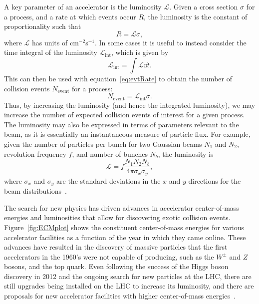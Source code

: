 A key parameter of an accelerator is the luminosity $\mathcal{L}$.
Given a cross section $\sigma$ for a process, and a rate at which events occur $R$, the luminosity is the constant of proportionality such that
\begin{equation}\label{eq:evtRate}
  R=\mathcal{L}\sigma,
\end{equation}
where $\mathcal{L}$ has units of cm$^{-2}$s$^{-1}$.
In some cases it is useful to instead consider the time integral of the luminosity $\mathcal{L}_\mathrm{int}$, which is given by
\begin{equation}
  \mathcal{L}_\mathrm{int}=\int\mathcal{L}\dd{t}.
\end{equation}
This can then be used with equation~\ref{eq:evtRate} to obtain the number of collision events $N_\mathrm{event}$ for a process:
\begin{equation}
  N_\mathrm{event}=\mathcal{L}_\mathrm{int}\sigma.
\end{equation}
Thus, by increasing the luminosity (and hence the integrated luminosity), we may increase the number of expected collision events of interest for a given process.
The luminosity may also be expressed in terms of parameters relevant to the beam, as it is essentially an instantaneous measure of particle flux.
For example, given the number of particles per bunch for two Gaussian beams $N_1$ and $N_2$, revolution frequency $f$, and number of bunches $N_b$, the luminosity is
\begin{equation}
  \mathcal{L}=f\frac{N_1N_2N_b}{4\pi\sigma_x\sigma_y},
\end{equation}
where $\sigma_x$ and $\sigma_y$ are the standard deviations in the $x$ and $y$ directions for the beam distributions~\cite{Herr:941318}.

The search for new physics has driven advances in accelerator center-of-mass energies and luminosities that allow for discovering exotic collision events.
Figure~\ref{fig:ECMplot} shows the constituent center-of-mass energies for various accelerator facilities as a function of the year in which they came online.
These advances have resulted in the discovery of massive particles that the first accelerators in the 1960's were not capable of producing, such as the $W^\pm$ and $Z$ bosons, and the top quark.
Even following the success of the Higgs boson discovery in 2012 and the ongoing search for new particles at the LHC, there are still upgrades being installed on the LHC to increase its luminosity, and there are proposals for new accelerator facilities with higher center-of-mass energies~\cite{Bicer_2014}.

